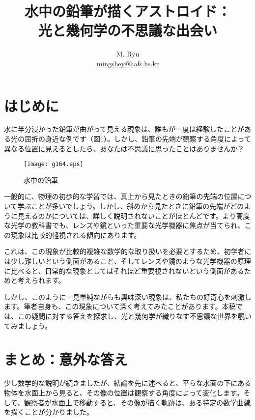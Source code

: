 \documentclass[twocolumn]{article}
\title{水中の鉛筆が描くアストロイド：\\光と幾何学の不思議な出会い}
\author{M. Ryu \\ {\href{mailto:mingshey@hafs.hs.kr}{mingshey@hafs.hs.kr}}}
\begin{document}
	\maketitle
	\newcommand{\romana}{{a}}
	\newcommand{\romanb}{{b}}
	\newcommand{\romanA}{{A}}
	\newcommand{\romanB}{{B}}
	\newcommand{\greeka}{{\alpha}}
	\newcommand{\greekb}{{\beta}}
	\newcommand{\Aprime}{{A^{\prime}}}
	\newcommand{\Bprime}{{B^{\prime}}}
	\renewcommand{\figurename}{図}
	\section{はじめに}
	
	水に半分浸かった鉛筆が曲がって見える現象は、誰もが一度は経験したことがある光の屈折の身近な例です（図1）。しかし、鉛筆の先端が観察する角度によって異なる位置に見えるとしたら、あなたは不思議に思ったことはありませんか？
	
	\begin{figure}[ht]
		\centering
		\texttt{[image: g164.eps]}
		\caption{水中の鉛筆}
		\label{fig:pencil}
	\end{figure}
	
	一般的に、物理の初歩的な学習では、真上から見たときの鉛筆の先端の位置について学ぶことが多いでしょう。しかし、斜めから見たときに鉛筆の先端がどのように見えるのかについては、詳しく説明されないことがほとんどです。より高度な光学の教科書でも、レンズや鏡といった重要な光学機器に焦点が当てられ、この現象は比較的軽視される傾向にあります。
	
	これは、この現象が比較的複雑な数学的な取り扱いを必要とするため、初学者には少し難しいという側面があること、そしてレンズや鏡のような光学機器の原理に比べると、日常的な現象としてはそれほど重要視されないという側面があるためと考えられます。
	
	しかし、このように一見単純ながらも興味深い現象は、私たちの好奇心を刺激します。筆者自身も、この現象について深く考えてみたことがあります。本稿では、この疑問に対する答えを探求し、光と幾何学が織りなす不思議な世界を覗いてみましょう。
	
	\section{まとめ：意外な答え}
	
	少し数学的な説明が続きましたが、結論を先に述べると、平らな水面の下にある物体を水面上から見ると、その像の位置は観察する角度によって変化します。そして、観察者が水面上で移動すると、その像が描く軌跡は、ある特定の数学曲線を描くことが分かりました。
	
\end{document}
